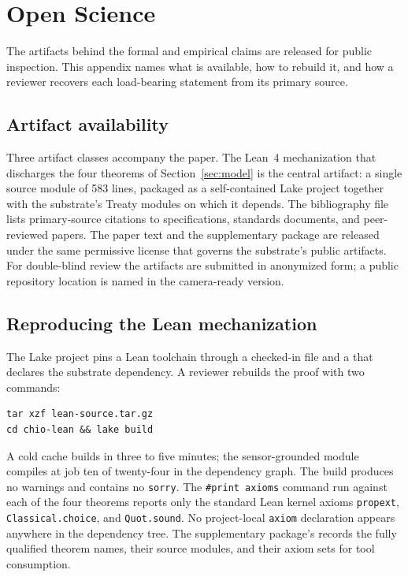 \section{Open Science}
\label{sec:open-science}

The artifacts behind the formal and empirical claims are released for
public inspection. This appendix names what is available, how to
rebuild it, and how a reviewer recovers each load-bearing statement
from its primary source.

\subsection{Artifact availability}
\label{sec:open-science:availability}

Three artifact classes accompany the paper. The Lean~4 mechanization
that discharges the four theorems of Section~\ref{sec:model} is the
central artifact: a single source module of 583 lines, packaged as a
self-contained Lake project together with the substrate's Treaty
modules on which it depends. The bibliography file lists primary-source
citations to specifications, standards documents, and peer-reviewed
papers. The paper text and the supplementary package are released under
the same permissive license that governs the substrate's public
artifacts. For double-blind review the artifacts are submitted in
anonymized form; a public repository location is named in the
camera-ready version.

\subsection{Reproducing the Lean mechanization}
\label{sec:open-science:lean}

The Lake project pins a Lean toolchain through a checked-in
 file and a  that declares the
substrate dependency. A reviewer rebuilds the proof with two commands:

\begin{verbatim}
tar xzf lean-source.tar.gz
cd chio-lean && lake build
\end{verbatim}

A cold cache builds in three to five minutes; the sensor-grounded
module compiles at job ten of twenty-four in the dependency graph. The
build produces no warnings and contains no \texttt{sorry}. The
\texttt{\#print axioms} command run against each of the four theorems
reports only the standard Lean kernel axioms \texttt{propext},
\texttt{Classical.choice}, and \texttt{Quot.sound}. No project-local
\texttt{axiom} declaration appears anywhere in the dependency tree.
The supplementary package's  records the
fully qualified theorem names, their source modules, and their axiom
sets for tool consumption.

